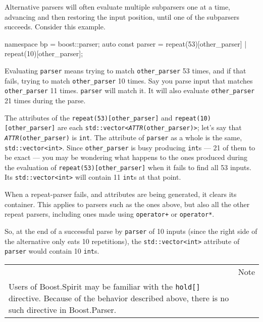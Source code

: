 Alternative parsers will often evaluate multiple subparsers one at a time, advancing and then restoring the input position, until one of the subparsers succeeds. Consider this example.

\begin{code}
namespace bp = boost::parser;
auto const parser = repeat(53)[other_parser] | repeat(10)[other_parser];
\end{code}

Evaluating \texttt{parser} means trying to match \texttt{other\_parser} 53 times, and if that fails, trying to match \texttt{other\_parser} 10 times. Say you parse input that matches \texttt{other\_parser} 11 times. \texttt{parser} will match it. It will also evaluate \texttt{other\_parser} 21 times during the parse.

The attributes of the \texttt{repeat(53){[}other\_parser{]}} and \texttt{repeat(10){[}other\_parser{]}} are each \texttt{std::vector<}\emph{\texttt{ATTR}}\texttt{(other\_parser)>}; let's say that \emph{\texttt{ATTR}}\texttt{(other\_parser)} is \texttt{int}. The attribute of \texttt{parser} as a whole is the same, \texttt{std::vector<int>}. Since \texttt{other\_parser} is busy producing \texttt{int}s --- 21 of them to be exact --- you may be wondering what happens to the ones produced during the evaluation of \texttt{repeat(53){[}other\_parser{]}} when it fails to find all 53 inputs. Its \texttt{std::vector<int>} will contain 11 \texttt{int}s at that point.

When a repeat-parser fails, and attributes are being generated, it clears its container. This applies to parsers such as the ones above, but also all the other repeat parsers, including ones made using \texttt{operator+} or \texttt{operator*}.

So, at the end of a successful parse by \texttt{parser} of 10 inputs (since the right side of the alternative only eats 10 repetitions), the \texttt{std::vector<int>} attribute of \texttt{parser} would contain 10 \texttt{int}s.

\begin{longtable}[]{@{}
  >{\raggedright\arraybackslash}p{}
  >{\raggedright\arraybackslash}p{}@{}}
\toprule\noalign{}
\endhead
\bottomrule\noalign{}
\endlastfoot
\begin{minipage}[t]{\linewidth}\raggedright
\end{minipage} & Note \\
Users of Boost.Spirit may be familiar with the \texttt{hold{[}{]}} directive. Because of the behavior described above, there is no such directive in Boost.Parser. & \\
\end{longtable}

